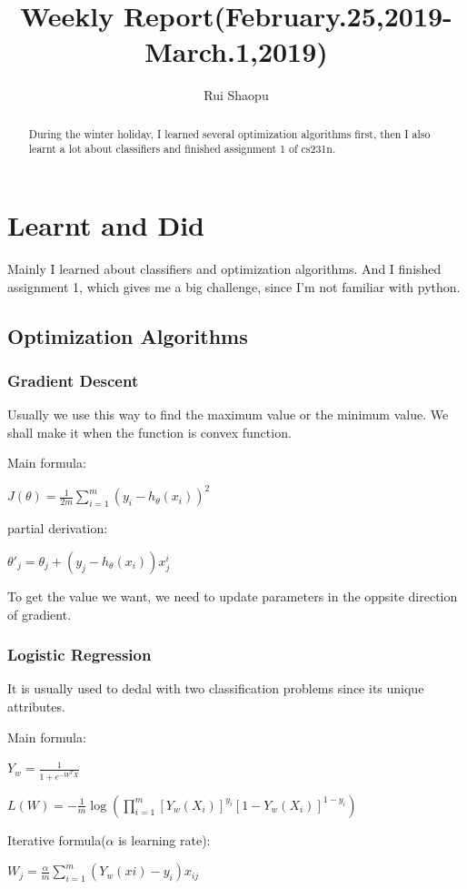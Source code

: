 \documentclass{article} %
\title{Weekly Report(February.25,2019-March.1,2019)}
\author{Rui Shaopu}
\begin{document}
\maketitle

\begin{abstract}
During the winter holiday, I learned several optimization algorithms first, then I also learnt a lot about classifiers and finished assignment 1 of cs231n.
\end{abstract}

\section{Learnt and Did}

Mainly I learned about classifiers and optimization algorithms. And I finished assignment 1, which gives me a big challenge, since I'm not familiar with python.

\subsection{Optimization Algorithms}
\subsubsection{Gradient Descent}
Usually we use this way to find the maximum value or the minimum value. We shall make it when the function is convex function.

Main formula:
\begin{center}
${\displaystyle J(\theta) = \frac{1}{2m}\sum_{i=1}^{m}(y_i-h_\theta(x_i))^2}$ 
\end{center}
partial derivation:
\begin{center}
${\displaystyle \theta'_j=\theta_j+(y_j-h_\theta(x_i))x_j^i}$
\end{center}
To get the value we want, we need to update parameters in the oppsite direction of gradient.

\subsubsection{Logistic Regression}
It is usually used to dedal with two classification problems since its unique attributes.

Main formula:
\begin{center}
${\displaystyle Y_w=\frac{1}{1+e^{-W^TX}}}$
\end{center}
\begin{center}
${\displaystyle L(W)=-\frac{1}{m}\log({\prod_{i=1}^{m}[Y_w(X_i)]^{y_i}[1-Y_w(X_i)]^{1-y_i}})}$
\end{center}
Iterative formula($\alpha$ is learning rate):
\begin{center}
${\displaystyle W_j=\frac{\alpha}{m}\sum_{i=1}^{m}(Y_w(xi)-y_i)x_{ij}}$
\end{center}
\end{document}
